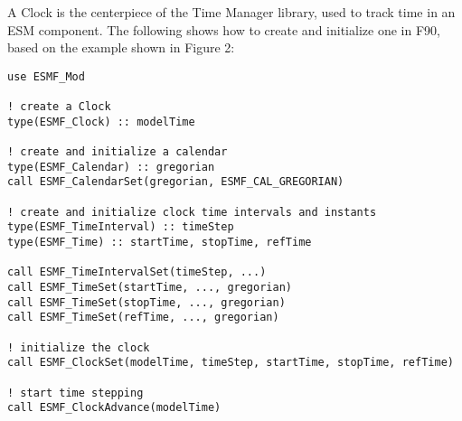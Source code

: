 
A Clock is the centerpiece of the Time Manager library, used to track time
in an ESM component.  The following shows how to create and initialize one
in F90, based on the example shown in Figure 2:

\begin{verbatim}
use ESMF_Mod

! create a Clock
type(ESMF_Clock) :: modelTime

! create and initialize a calendar
type(ESMF_Calendar) :: gregorian
call ESMF_CalendarSet(gregorian, ESMF_CAL_GREGORIAN)

! create and initialize clock time intervals and instants
type(ESMF_TimeInterval) :: timeStep
type(ESMF_Time) :: startTime, stopTime, refTime

call ESMF_TimeIntervalSet(timeStep, ...)
call ESMF_TimeSet(startTime, ..., gregorian)
call ESMF_TimeSet(stopTime, ..., gregorian)
call ESMF_TimeSet(refTime, ..., gregorian)

! initialize the clock
call ESMF_ClockSet(modelTime, timeStep, startTime, stopTime, refTime)

! start time stepping
call ESMF_ClockAdvance(modelTime)
\end{verbatim}
